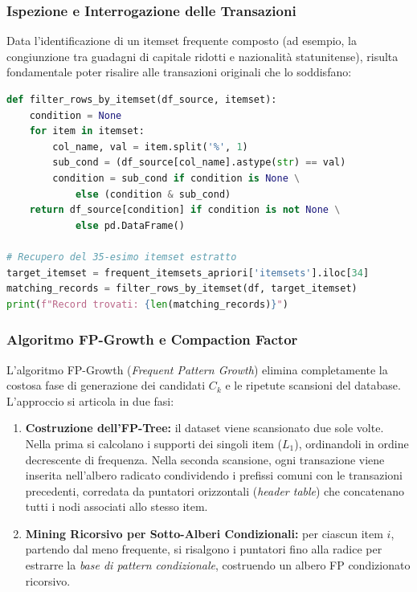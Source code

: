 \subsubsection{Ispezione e Interrogazione delle Transazioni}
Data l'identificazione di un itemset frequente composto (ad esempio, la congiunzione tra guadagni di capitale ridotti e nazionalità statunitense), risulta fondamentale poter risalire alle transazioni originali che lo soddisfano:

\begin{lstlisting}[language=Python, caption={Filtraggio delle transazioni che soddisfano uno specifico itemset frequente.}]
def filter_rows_by_itemset(df_source, itemset):
    condition = None
    for item in itemset:
        col_name, val = item.split('%', 1)
        sub_cond = (df_source[col_name].astype(str) == val)
        condition = sub_cond if condition is None \
            else (condition & sub_cond)
    return df_source[condition] if condition is not None \
            else pd.DataFrame()

# Recupero del 35-esimo itemset estratto
target_itemset = frequent_itemsets_apriori['itemsets'].iloc[34]
matching_records = filter_rows_by_itemset(df, target_itemset)
print(f"Record trovati: {len(matching_records)}")
\end{lstlisting}

\subsubsection{Algoritmo FP-Growth e Compaction Factor}
L'algoritmo FP-Growth (\textit{Frequent Pattern Growth}) \cite{han2000} elimina completamente la costosa fase di generazione dei candidati $C_k$ e le ripetute scansioni del database. L'approccio si articola in due fasi:
\begin{enumerate}
    \item \textbf{Costruzione dell'FP-Tree:} il dataset viene scansionato due sole volte. Nella prima si calcolano i supporti dei singoli item ($L_1$), ordinandoli in ordine decrescente di frequenza. Nella seconda scansione, ogni transazione viene inserita nell'albero radicato condividendo i prefissi comuni con le transazioni precedenti, corredata da puntatori orizzontali (\textit{header table}) che concatenano tutti i nodi associati allo stesso item.
    \item \textbf{Mining Ricorsivo per Sotto-Alberi Condizionali:} per ciascun item $i$, partendo dal meno frequente, si risalgono i puntatori fino alla radice per estrarre la \textit{base di pattern condizionale}, costruendo un albero FP condizionato ricorsivo.
\end{enumerate}

